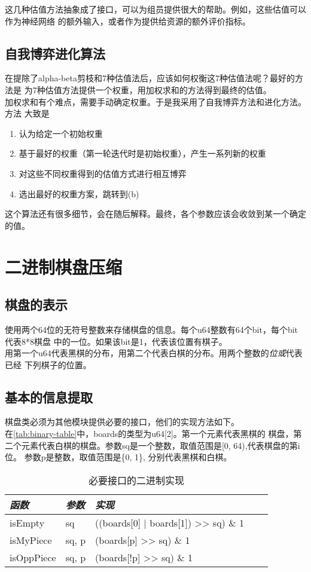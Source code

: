 \documentclass[a4paper]{article}
\begin{document}
这几种估值方法抽象成了接口，可以为组员提供很大的帮助。例如，这些估值可以作为神经网络
的额外输入，或者作为提供给资源的额外评价指标。
\subsection{自我博弈进化算法}
在提除了alpha-beta剪枝和7种估值法后，应该如何权衡这7种估值法呢？最好的方法是
为7种估值方法提供一个权重，用加权求和的方法得到最终的估值。\\


加权求和有个难点，需要手动确定权重。于是我采用了自我博弈方法和进化方法。方法
大致是
\begin{enumerate}[label=(\alph*)]
    \item 认为给定一个初始权重
    \item 基于最好的权重（第一轮迭代时是初始权重），产生一系列新的权重
    \item 对这些不同权重得到的估值方式进行相互博弈
    \item 选出最好的权重方案，跳转到(b)
\end{enumerate}
这个算法还有很多细节，会在随后解释。最终，各个参数应该会收敛到某一个确定的值。
\section{二进制棋盘压缩}
\subsection{棋盘的表示}
使用两个64位的无符号整数来存储棋盘的信息。每个u64整数有64个bit，每个bit代表8*8棋盘
中的一位。如果该bit是1，代表该位置有棋子。\\

用第一个u64代表黑棋的分布，用第二个代表白棋的分布。用两个整数的\emph{位或}代表已经
下列棋子的位置。

\subsection{基本的信息提取}
棋盘类必须为其他模块提供必要的接口，他们的实现方法如下。\\

在\autoref{tab:binary-table}中，boards的类型为u64[2]。第一个元素代表黑棋的
棋盘，第二个元素代表白棋的棋盘。参数sq是一个整数，取值范围是[0, 64),代表棋盘的第i位。
参数p是整数，取值范围是\{0, 1\}, 分别代表黑棋和白棋。
\begin{table}[!htb]
\caption{必要接口的二进制实现}\label{tab:binary-table}
\centering
\begin{tabular}{@{} *5l @{}}
    \toprule
\emph{函数} & \emph{参数} & \emph{实现}&& \\
    \midrule
    isEmpty  & sq & ((boards[0] | boards[1]) >> sq) \& 1 \\
    isMyPiece & sq, p & (boards[p] >> sq) \& 1 \\
    isOppPiece & sq, p & (boards[!p] >> sq) \&  1 \\
    \bottomrule
\hline
\end{tabular}
\end{table}
\end{document}
